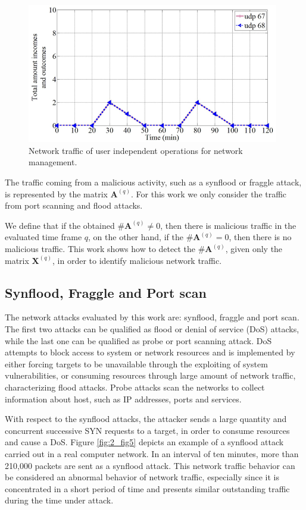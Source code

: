 \begin{figure}[h!]
     \centering 
     \includegraphics[width=11cm]{figures/fig04.png}
     \caption{Network traffic of user independent operations for network management.}
     \label{fig:2_fig4}
\end{figure}

The traffic coming from a malicious activity, such as a synflood or fraggle attack, is represented by the matrix $\boldsymbol{A}^{(q)}$. For this work we only consider the traffic from port scanning and flood attacks.

We define that if the obtained $\#\boldsymbol{A}^{(q)} ≠ 0$, then there is malicious traffic in the evaluated time frame $q$, on the other hand, if the $\#\boldsymbol{A}^{(q)} = 0$, then there is no malicious traffic. This work shows how to detect the $\#\boldsymbol{A}^{(q)}$, given only the matrix $\boldsymbol{X}^{(q)}$, in order to identify malicious network traffic.

\subsection{Synflood, Fraggle and Port scan}
\label{sec:2_SynfloodFraggleandPortscan}

The network attacks evaluated by this work are: synflood, fraggle and port scan. The first two attacks can be qualified as flood or denial of service (DoS) attacks, while the last one can be qualified as probe or port scanning attack. DoS attempts to block access to system or network resources and is implemented by either forcing targets to be unavailable through the exploiting of system vulnerabilities, or consuming resources through large amount of network traffic, characterizing flood attacks. Probe attacks scan the networks to collect information about host, such as IP addresses, ports and services.


With respect to the synflood attacks, the attacker sends a large quantity and concurrent successive SYN requests to a target, in order to consume resources and cause a DoS. Figure \ref{fig:2_fig5} depicts an example of a synflood attack carried out in a real computer network. In an interval of ten minutes, more than 210,000 packets are sent as a synflood attack. This network traffic behavior can be considered an abnormal behavior of network traffic, especially since it is concentrated in a short period of time and presents similar outstanding traffic during the time under attack.

